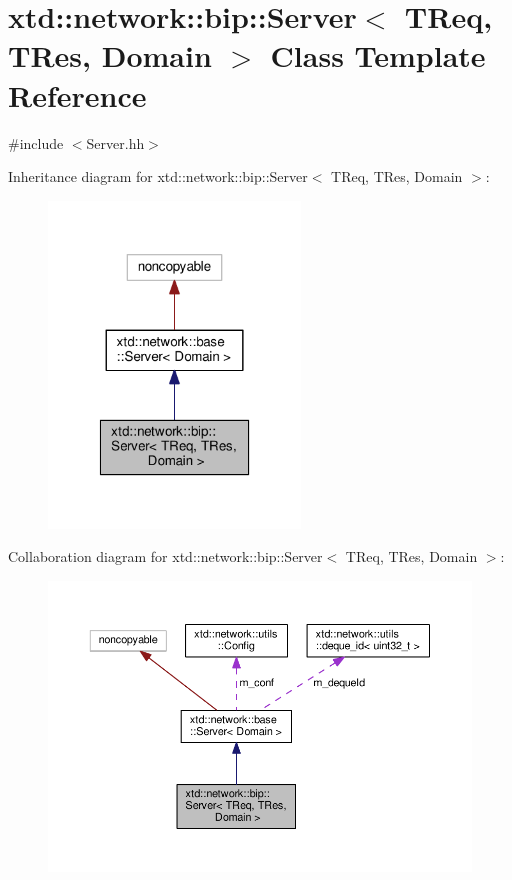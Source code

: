 \hypertarget{classxtd_1_1network_1_1bip_1_1Server}{\section{xtd\-:\-:network\-:\-:bip\-:\-:Server$<$ T\-Req, T\-Res, Domain $>$ Class Template Reference}
\label{classxtd_1_1network_1_1bip_1_1Server}
}


{\ttfamily \#include $<$Server.\-hh$>$}



Inheritance diagram for xtd\-:\-:network\-:\-:bip\-:\-:Server$<$ T\-Req, T\-Res, Domain $>$\-:
\nopagebreak
\begin{figure}[H]
\begin{center}
\leavevmode
\includegraphics[width=190pt]{classxtd_1_1network_1_1bip_1_1Server__inherit__graph}
\end{center}
\end{figure}


Collaboration diagram for xtd\-:\-:network\-:\-:bip\-:\-:Server$<$ T\-Req, T\-Res, Domain $>$\-:
\nopagebreak
\begin{figure}[H]
\begin{center}
\leavevmode
\includegraphics[width=350pt]{classxtd_1_1network_1_1bip_1_1Server__coll__graph}
\end{center}
\end{figure}
